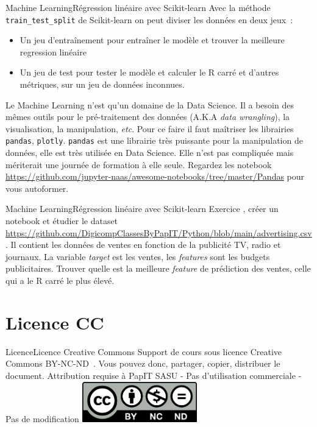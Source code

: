 \documentclass{beamer}
\begin{document}
    \begin{frame}{Machine Learning}{Régression linéaire avec Scikit-learn}
        Avec la méthode \lstinline{train_test_split} de Scikit-learn on peut diviser les données en deux jeux~:
        \begin{itemize}
            \item Un jeu d'entraînement pour entraîner le modèle et trouver la meilleure regression linéaire
            \item Un jeu de test pour tester le modèle et calculer le R carré et d'autres métriques, sur un jeu de données inconnues.
        \end{itemize}
        \begin{dangercolorbox}
            Le Machine Learning n'est qu'un domaine de la Data Science.
            Il a besoin des mêmes outils pour le pré-traitement des données (A.K.A \textit{data wrangling}), la visualisation, la manipulation, \textit{etc}.
            Pour ce faire il faut maîtriser les librairies \lstinline{pandas}, \lstinline{plotly}.
            \lstinline{pandas} est une librairie très puissante pour la manipulation de données, elle est très utilisée en Data Science.
            Elle n'est pas compliquée mais mériterait une journée de formation à elle seule.
            Regardez les notebook \url{https://github.com/jupyter-naas/awesome-notebooks/tree/master/Pandas} pour vous autoformer.
        \end{dangercolorbox}
    \end{frame}

    \begin{frame}{Machine Learning}{Régression linéaire avec Scikit-learn}
        Exercice \execcounterdispinc{}, créer un notebook et étudier le dataset \url{https://github.com/DigicompClassesByPapIT/Python/blob/main/advertising.csv}.
        Il contient les données de ventes en fonction de la publicité TV, radio et journaux.
        \bigbreak
        La variable \textit{target} est les ventes, les \textit{features} sont les budgets publicitaires.
        Trouver quelle est la meilleure \textit{feature} de prédiction des ventes, celle qui a le R carré le plus élevé.
    \end{frame}


    \section{Licence CC}\label{sec:licence}

    \begin{frame}{Licence}{Licence Creative Commons}
        Support de cours sous licence Creative Commons BY-NC-ND~.
        \bigbreak
        Vous pouvez donc, partager, copier, distribuer le document.
        \bigbreak
        Attribution requise à PapIT SASU - Pas d’utilisation commerciale - Pas de modification
        \bigbreak
        \centering
        \includegraphics[width=5cm]{image/by-nc-nd-logo}
    \end{frame}
\end{document}
